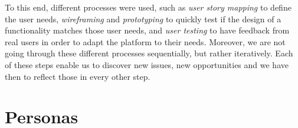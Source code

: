 \documentclass[a4paper,12pt,twoside]{article}
\begin{document}
To this end, different processes were used, such as \emph{user story mapping} to define the user needs, \emph{wireframing} and \emph{prototyping} to quickly test if the design of a functionality matches those user needs, and \emph{user testing} to have feedback from real users in order to adapt the platform to their needs.
Moreover, we are not going through these different processes sequentially, but rather iteratively.
Each of these steps enable us to discover new issues, new opportunities and we have then to reflect those in every other step.

\section{Personas}

\begin{figure}
    \vspace{-13pt}
    \begin{subfigure}[t]{1.8cm}
        \centering
    \end{subfigure}
    \hfill
    \begin{subfigure}[t]{1.8cm}
        \centering
    \end{subfigure}

\end{figure}
\end{document}
